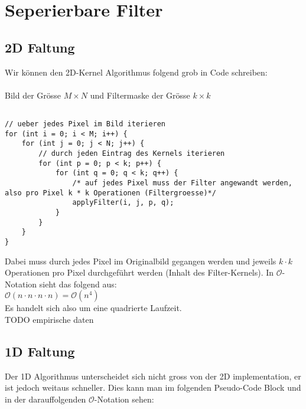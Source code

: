 \documentclass{article} %
\begin{document}
\section{Seperierbare Filter}
\subsection{2D Faltung}

Wir können den 2D-Kernel Algorithmus folgend grob in Code schreiben:\\ \\
Bild der Grösse $M \times N$ und Filtermaske der Grösse $k \times k$

\begin{lstlisting}

// ueber jedes Pixel im Bild iterieren
for (int i = 0; i < M; i++) {																					
	for (int j = 0; j < N; j++) {																			
		// durch jeden Eintrag des Kernels iterieren
		for (int p = 0; p < k; p++) {																			
			for (int q = 0; q < k; q++) {																		
				/* auf jedes Pixel muss der Filter angewandt werden, also pro Pixel k * k Operationen (Filtergroesse)*/
				applyFilter(i, j, p, q);
			}
		}
	}
}
\end{lstlisting}

Dabei muss durch jedes Pixel im Originalbild gegangen werden und jeweils $k \cdot k$ Operationen pro Pixel durchgeführt werden (Inhalt des Filter-Kernels). In $\mathcal{O}$-Notation sieht das folgend aus: \\
$\mathcal{O} (n \cdot n \cdot n \cdot n) = \mathcal{O}(n^4)$ \\
Es handelt sich also um eine quadrierte Laufzeit.\\
TODO empirische daten

\subsection{1D Faltung}

Der 1D Algorithmus unterscheidet sich nicht gross von der 2D implementation, er ist jedoch weitaus schneller. Dies kann man im folgenden Pseudo-Code Block und in der darauffolgenden $\mathcal{O}$-Notation sehen:
\end{document}
